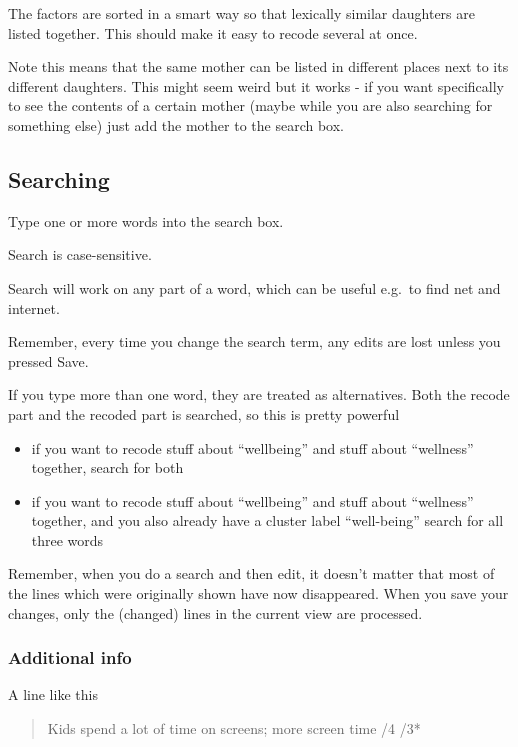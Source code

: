 \documentclass[
]{book}
\providecommand{\tightlist}{%
  \setlength{\itemsep}{0pt}\setlength{\parskip}{0pt}}
\begin{document}
The factors are sorted in a smart way so that lexically similar daughters are listed together. This should make it easy to recode several at once.

Note this means that the same mother can be listed in different places next to its different daughters. This might seem weird but it works - if you want specifically to see the contents of a certain mother (maybe while you are also searching for something else) just add the mother to the search box.

\hypertarget{searching}{%
\subsection{Searching}\label{searching}}

Type one or more words into the search box.

Search is case-sensitive.

Search will work on any part of a word, which can be useful e.g.~to find net and internet.

Remember, every time you change the search term, any edits are lost unless you pressed Save.

If you type more than one word, they are treated as alternatives. Both the recode part and the recoded part is searched, so this is pretty powerful

\begin{itemize}
\tightlist
\item
  if you want to recode stuff about ``wellbeing'' and stuff about ``wellness'' together, search for both
\item
  if you want to recode stuff about ``wellbeing'' and stuff about ``wellness'' together, and you also already have a cluster label ``well-being'' search for all three words
\end{itemize}

Remember, when you do a search and then edit, it doesn't matter that most of the lines which were originally shown have now disappeared. When you save your changes, only the (changed) lines in the current view are processed.

\hypertarget{additional-info}{%
\subsubsection{Additional info}\label{additional-info}}

A line like this

\begin{quote}
Kids spend a lot of time on screens; more screen time /4 /3*
\end{quote}
\end{document}
